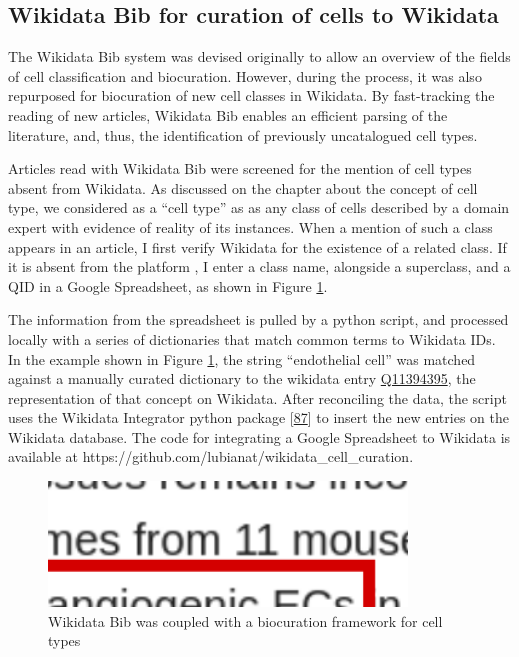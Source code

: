 \hypertarget{wikidata-bib-for-curation-of-cells-to-wikidata}{%
\subsection{Wikidata Bib for curation of cells to Wikidata}\label{wikidata-bib-for-curation-of-cells-to-wikidata}}

The Wikidata Bib system was devised originally to allow an overview of the fields of cell classification and biocuration.
However, during the process, it was also repurposed for biocuration of new cell classes in Wikidata.
By fast-tracking the reading of new articles, Wikidata Bib enables an efficient parsing of the literature, and, thus, the identification of previously uncatalogued cell types.

Articles read with Wikidata Bib were screened for the mention of cell types absent from Wikidata.
As discussed on the chapter about the concept of cell type, we considered as a ``cell type'' as as any class of cells described by a domain expert with evidence of reality of its instances.
When a mention of such a class appears in an article, I first verify Wikidata for the existence of a related class.
If it is absent from the platform , I enter a class name, alongside a superclass, and a QID in a Google Spreadsheet, as shown in Figure \ref{fig:biocuration_of_cells}.

The information from the spreadsheet is pulled by a python script, and processed locally with a series of dictionaries that match common terms to Wikidata IDs.
In the example shown in Figure \ref{fig:biocuration_of_cells}, the string ``endothelial cell'' was matched against a manually curated dictionary to the wikidata entry \href{https://www.wikidata.org/wiki/Q11394395}{Q11394395}, the representation of that concept on Wikidata.
After reconciling the data, the script uses the Wikidata Integrator python package {[}\protect\hyperlink{ref-qDI8I4IJ}{87}{]} to insert the new entries on the Wikidata database.
The code for integrating a Google Spreadsheet to Wikidata is available at https://github.com/lubianat/wikidata\_cell\_curation.

\begin{figure}
\hypertarget{fig:biocuration_of_cells}{%
\centering
\includegraphics[width=0.85\textwidth,height=\textheight]{images/biocuration_of_cells.png}
\caption{Wikidata Bib was coupled with a biocuration framework for cell types}\label{fig:biocuration_of_cells}
}
\end{figure}

